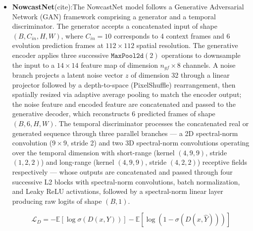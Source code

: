 \documentclass{article}
\begin{document}
\begin{itemize}
   which decomposes full spatiotemporal attention into three independent 1D attention passes along the temporal, height, and width axes respectively, with 4 attention heads, relative positional biases, dropout rates of 0.1 for attention, projection, and feed-forward layers, and inter-block feed-forward networks with GELU activation and layer normalization. A set of 8 learnable global vectors is incorporated in the encoder to capture long-range global context via dedicated global self-attention. The decoder additionally applies 
   1×1 cuboid cross-attention to condition each decoder block on the corresponding encoder memory, with the decoder query sequence initialized from zeros and projected via a learned linear layer. A final linear projection maps the decoder output back to the 3-channel target space.
  \item \textbf{NowcastNet}(cite):The NowcastNet model follows a Generative Adversarial Network (GAN) framework comprising a generator and a temporal discriminator. The generator accepts a concatenated input of shape $(B, C_{in}, H, W)$, where $C_{in} = 10$ corresponds 
to 4 context frames and 6 evolution prediction frames at $112 \times 112$ spatial 
resolution. The generative encoder applies three successive $\texttt{MaxPool2d}(2)$ 
operations to downsample the input to a $14 \times 14$ feature map of dimension 
$n_{gf} \times 8$ channels. A noise branch projects a latent noise vector $z$ of 
dimension 32 through a linear projector followed by a depth-to-space (PixelShuffle) 
rearrangement, then spatially resized via adaptive average pooling to match the 
encoder output; the noise feature and encoded feature are concatenated and passed 
to the generative decoder, which reconstructs 6 predicted frames of shape 
$(B, 6, H, W)$. The temporal discriminator processes the concatenated real or 
generated sequence through three parallel branches --- a 2D spectral-norm 
convolution ($9 \times 9$, stride 2) and two 3D spectral-norm convolutions 
operating over the temporal dimension with short-range (kernel $(4, 9, 9)$, 
stride $(1, 2, 2)$) and long-range (kernel $(4, 9, 9)$, stride $(4, 2, 2)$) 
receptive fields respectively --- whose outputs are concatenated and passed 
through four successive L2 blocks with spectral-norm convolutions, batch 
normalization, and Leaky ReLU activations, followed by a spectral-norm linear 
layer producing raw logits of shape $(B, 1)$.

\begin{equation}
    \mathcal{L}_{D} = -\mathbb{E}\left[\log \sigma(D(x, Y))\right] - \mathbb{E}\left[\log\left(1 - \sigma(D(x, \hat{Y}))\right)\right]
\end{equation}


\end{itemize}
\end{document}
